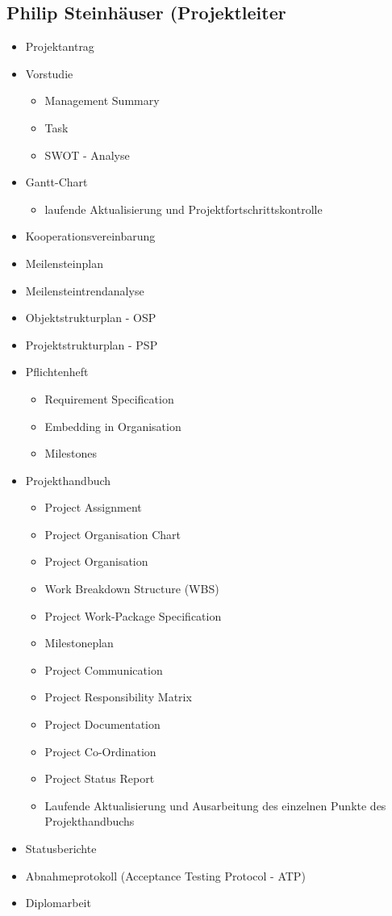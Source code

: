 \subsection{Philip Steinhäuser (Projektleiter}
\begin{itemize}
	\item Projektantrag
	\item Vorstudie
	\begin{itemize}
		\item Management Summary
		\item Task
		\item SWOT - Analyse
	\end{itemize}
	\item Gantt-Chart
	\begin{itemize}
		\item laufende Aktualisierung und Projektfortschrittskontrolle
	\end{itemize}
	\item Kooperationsvereinbarung
	\item Meilensteinplan
	\item Meilensteintrendanalyse
	\item Objektstrukturplan - OSP
	\item Projektstrukturplan - PSP
	\item Pflichtenheft
	\begin{itemize}
		\item Requirement Specification
		\item Embedding in Organisation
		\item Milestones
	\end{itemize}
	\item Projekthandbuch
	\begin{itemize}
		\item Project Assignment
		\item Project Organisation Chart
		\item Project Organisation
		\item Work Breakdown Structure (WBS)
		\item Project Work-Package Specification
		\item Milestoneplan
		\item Project Communication
		\item Project Responsibility Matrix
		\item Project Documentation
		\item Project Co-Ordination
		\item Project Status Report
		\item Laufende Aktualisierung und Ausarbeitung des einzelnen Punkte des Projekthandbuchs
	\end{itemize}
	\item Statusberichte
	\item Abnahmeprotokoll (Acceptance Testing Protocol - ATP)
	\item Diplomarbeit
\end{itemize}